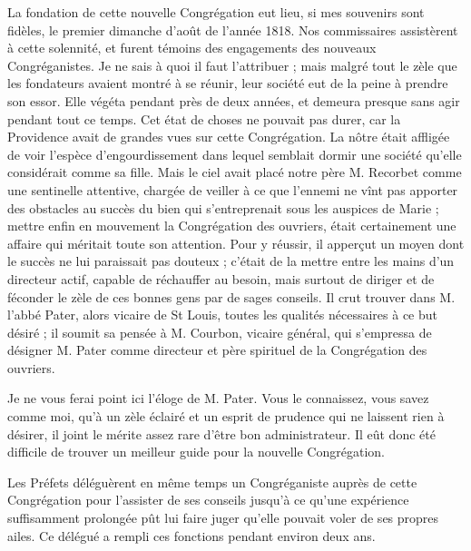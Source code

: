 La fondation de cette nouvelle Congrégation eut lieu, si mes souvenirs sont fidèles, le premier dimanche d'août de l'année 1818. Nos commissaires assistèrent à cette solennité, et furent témoins des engagements des nouveaux Congréganistes. Je ne sais à quoi il faut l'attribuer ; mais malgré tout le zèle que les fondateurs avaient montré à se réunir, leur société eut de la peine à prendre son essor. Elle végéta pendant près de deux années, et demeura presque sans agir pendant tout ce temps.
Cet état de choses ne pouvait pas durer, car la Providence avait de grandes vues sur cette Congrégation. La nôtre était affligée de voir l'espèce d'engourdissement dans lequel semblait dormir une société qu'elle considérait comme sa fille. Mais le ciel avait placé notre père M. Recorbet comme une sentinelle attentive, chargée de veiller à ce que l'ennemi ne vînt pas apporter des obstacles au succès du bien qui s'entreprenait sous les auspices de Marie ; mettre enfin en mouvement la Congrégation des ouvriers, était certainement une affaire qui méritait toute son attention. Pour y réussir, il apperçut un moyen dont le succès ne lui paraissait pas douteux ; c'était de la mettre entre les mains d'un directeur actif, capable de réchauffer au besoin, mais surtout de diriger et de féconder le zèle de ces bonnes gens par de sages conseils. Il crut trouver dans M. l'abbé Pater, alors vicaire de St Louis, toutes les qualités nécessaires à ce but désiré ; il soumit sa pensée à M. Courbon, vicaire général, qui s'empressa de désigner M. Pater comme directeur et père spirituel de la Congrégation des ouvriers.

Je ne vous ferai point ici l'éloge de M. Pater. Vous le connaissez, vous savez comme moi, qu'à un zèle éclairé et un esprit de prudence qui ne laissent rien à désirer, il joint le mérite assez rare d'être bon administrateur. Il eût donc été difficile de trouver un meilleur guide pour la nouvelle Congrégation.

Les Préfets déléguèrent en même temps un Congréganiste auprès de cette Congrégation pour l'assister de ses conseils jusqu'à
ce qu'une expérience suffisamment prolongée pût lui faire juger qu'elle pouvait voler de ses propres ailes. Ce délégué a rempli ces fonctions pendant environ deux ans.

